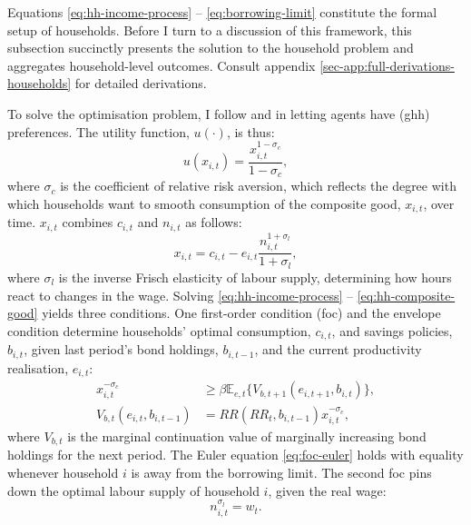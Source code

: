 \documentclass[a4paper,12pt]{article} %
\numberwithin{equation}{section} %
\numberwithin{figure}{section}
\numberwithin{table}{section}
\begin{document}
Equations \eqref{eq:hh-income-process} -- \eqref{eq:borrowing-limit} constitute the formal setup of households. Before I turn to a discussion of this framework, this subsection succinctly presents the solution to the household problem and aggregates household-level outcomes. Consult appendix \ref{sec-app:full-derivations-households} for detailed derivations.

To solve the optimisation problem, I follow \textcite{boehl2023econpizza} and \textcite{bayer2023} in letting agents have \textcite{ghh1988} (\Gls{ghh}) preferences. The utility function, $u( \cdot )$, is thus:
\begin{equation}
    u(x_{i,t}) = \frac{x_{i,t}^{1-\sigma_c}}{1-\sigma_c}, \label{eq:hh-utility-fun}
\end{equation}
where $\sigma_c$ is the coefficient of relative risk aversion, which reflects the degree with which households want to smooth consumption of the composite good, $x_{i,t}$, over time. $x_{i,t}$ combines $c_{i,t}$ and $n_{i,t}$ as follows:
\begin{equation}
    x_{i,t} = c_{i,t} - e_{i,t}\frac{n_{i,t}^{1+\sigma_l}}{1+\sigma_l},
    \label{eq:hh-composite-good}
\end{equation}
where $\sigma_l$ is the inverse Frisch elasticity of labour supply, determining how hours react to changes in the wage. Solving \eqref{eq:hh-income-process} -- \eqref{eq:hh-composite-good} yields three conditions. One first-order condition (\Gls{foc}) and the envelope condition determine households' optimal consumption, $c_{i,t}$, and savings policies, $b_{i,t}$, given last period's bond holdings, $b_{i,t-1}$, and the current productivity realisation, $e_{i,t}$:
\begin{align}
    x_{i,t}^{-\sigma_c} &\ge \beta \mathbb{E}_{e,t} \{ V_{b,t+1} (e_{i,t+1}, b_{i,t}) \}, \label{eq:foc-euler} \\
    V_{b,t} (e_{i,t}, b_{i,t-1}) &= RR (RR_t, b_{i,t-1}) x_{i,t}^{-\sigma_c}, \label{eq:foc-envelope} %
\end{align}
where $V_{b,t}$ is the marginal continuation value of marginally increasing bond holdings for the next period. The Euler equation \eqref{eq:foc-euler} holds with equality whenever household $i$ is away from the borrowing limit. The second \Gls{foc} pins down the optimal labour supply of household $i$, given the real wage:
\begin{equation}
n_{i,t}^{\sigma_l} = w_t. \label{eq:foc-labour-supply}
\end{equation}
\end{document}
